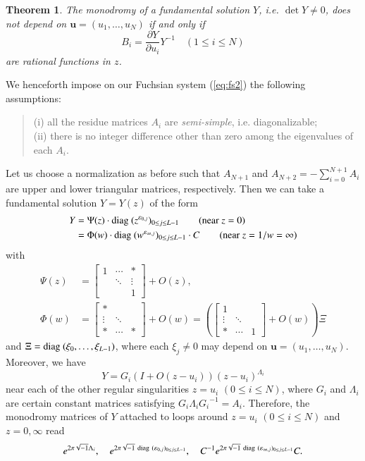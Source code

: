 \documentclass[12pt]{article}
\newtheorem{thm}{Theorem}[section]
\numberwithin{equation}{section}
\begin{document}
\begin{thm} 
The monodromy of a fundamental solution $Y$,
i.e. $\det Y \neq 0$,
does not depend on ${\boldsymbol u}=(u_1,\ldots,u_N)$
if and only if 
\begin{equation} \label{eq:defe}
B_i=\frac{\partial Y}{\partial u_i} Y^{-1}
\quad
(1 \leq i \leq N)
\end{equation}
are rational functions in $z$.
\end{thm}


We henceforth impose
on our Fuchsian system (\ref{eq:fs2}) 
 the following assumptions: 
\begin{quote}
(i) all the residue matrices $A_i$ are  {\it semi-simple}, i.e. diagonalizable;
\\
(ii) there is no integer difference other than zero
among the eigenvalues of each $A_i$.
\end{quote}
Let us choose a normalization as before 
such that
$A_{N+1}$ and $A_{N+2}=-\sum_{i=0}^{N+1} A_i$ are upper and lower triangular matrices, respectively.  
Then
we can take a fundamental solution 
$Y=Y(z)$
of the form 
\begin{align*}
Y &=
\Psi (z) \cdot {\rm diag \ }  (z^{\varepsilon_{0,j}})_{0 \leq j \leq L-1} 
\qquad \text{(near $z=0$)}
\\
&=
\Phi (w) \cdot {\rm diag \ }  (w^{\varepsilon_{\infty,j}})_{0 \leq j \leq L-1}
 \cdot C
 \qquad \text{(near $z=1/w=\infty$)}
\end{align*}
with
\begin{align*}
\Psi(z)
&=
\begin{bmatrix}
1 &  \cdots &*\\  
&\ddots& \vdots \\
&&1
\end{bmatrix} 
+O(z),
\\
\Phi(w)
&
=
\begin{bmatrix}
* &   &\\  
\vdots&\ddots&  \\
*& \cdots &*
\end{bmatrix} 
+O(w)
=
\left(
\begin{bmatrix}
1 &  &\\  
 \vdots&\ddots& \\ 
*& \cdots&1
\end{bmatrix}
+O(w)
\right)
\Xi
\end{align*}
and
$\Xi={\rm diag \ }  (\xi_0, \ldots, \xi_{L-1})$,
where each $\xi_j \neq 0$ may depend on 
$\boldsymbol u=(u_1, \ldots,u_N)$.
Moreover, 
we have
\begin{equation}
Y=G_i
(I+O(z-u_i))
(z-u_i)^{\Lambda_i}
\label{eq:solatui}
\end{equation}
near each of the other regular
singularities $z=u_i$ $(0 \leq i \leq N)$,
where
$G_i$ and $\Lambda_i$ are certain constant matrices
satisfying
$G_i \Lambda_i {G_i}^{-1}=A_i$.
Therefore, 
the monodromy matrices of $Y$ attached to loops around 
$z=u_i$ $(0 \leq i \leq N)$ and $z=0, \infty$
read
\[
e^{2 \pi \sqrt{-1}  \Lambda_i}, \quad 
e^{2 \pi \sqrt{-1} 
 {\rm \ diag \ }  (\varepsilon_{0,j})_{0 \leq j \leq L-1} },
 \quad
C^{-1}
e^{2 \pi \sqrt{-1} 
 {\rm \ diag \ }  (\varepsilon_{\infty,j})_{0 \leq j \leq L-1} }
C.
\] 
\end{document}
